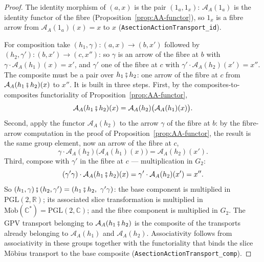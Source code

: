 \documentclass[11pt]{article}
\newcommand{\CC}{\mathbb{C}}
\newcommand{\RR}{\mathbb{R}}
\theoremstyle{plain}
\theoremstyle{definition}
\theoremstyle{remark}
\begin{document}
\begin{proof}
The identity morphism of $(a,x)$ is the pair $(1_a,1_x)$:
$\mathcal A_A(1_a)$ is the identity functor of the fibre
(Proposition~\ref{prop:AA-functor}), so $1_x$ is a fibre arrow from
$\mathcal A_A(1_a)(x)=x$ to $x$
\textup{(}\texttt{AsectionActionTransport\_id}\textup{)}.

For composition take $(h_1,\gamma):(a,x)\to(b,x')$ followed by
$(h_2,\gamma'):(b,x')\to(c,x'')$: so $\gamma$ is an arrow of the fibre
at $b$ with $\gamma\cdot\mathcal A_A(h_1)(x)=x'$, and $\gamma'$ one of
the fibre at $c$ with $\gamma'\cdot\mathcal A_A(h_2)(x')=x''$. The
composite must be a pair over $h_1\fatsemi h_2$: one arrow of the fibre
at $c$ from $\mathcal A_A(h_1\fatsemi h_2)(x)$ to $x''$. It is built in
three steps. First, by the composites-to-composites functoriality of
Proposition~\ref{prop:AA-functor},
\[
  \mathcal A_A(h_1\fatsemi h_2)(x)
  =\mathcal A_A(h_2)\bigl(\mathcal A_A(h_1)(x)\bigr).
\]
Second, apply the functor
$\mathcal A_A(h_2)$ to the arrow $\gamma$ of the fibre at $b$: by the
fibre-arrow computation in the proof of
Proposition~\ref{prop:AA-functor}, the result is the same group element,
now an arrow of the fibre at $c$,
\[
  \gamma\cdot\mathcal A_A(h_2)\bigl(\mathcal A_A(h_1)(x)\bigr)
  =\mathcal A_A(h_2)(x').
\]
Third, compose with $\gamma'$ in the fibre at $c$ --- multiplication in
$G_2$:
\[
  (\gamma'\gamma)\cdot\mathcal A_A(h_1\fatsemi h_2)(x)
  =\gamma'\cdot\mathcal A_A(h_2)(x')
  =x''.
\]
So $(h_1,\gamma)\fatsemi(h_2,\gamma')=(h_1\fatsemi h_2,\ \gamma'\gamma)$:
the base component is multiplied in $\mathrm{PGL}(2,\RR)$; its associated
slice transformation is multiplied in
$\operatorname{M\ddot ob}(\CC^*)=\mathrm{PGL}(2,\CC)$; and the fibre
component is multiplied in $G_2$.  The GPV transport belonging to
$\mathcal A_A(h_1\fatsemi h_2)$ is the composite of the transports already
belonging to $\mathcal A_A(h_1)$ and $\mathcal A_A(h_2)$. Associativity
follows from associativity in these groups together with the functoriality
that binds the slice M\"obius transport to the base composite
\textup{(}\texttt{AsectionActionTransport\_comp}\textup{)}.


\end{proof}
\end{document}
